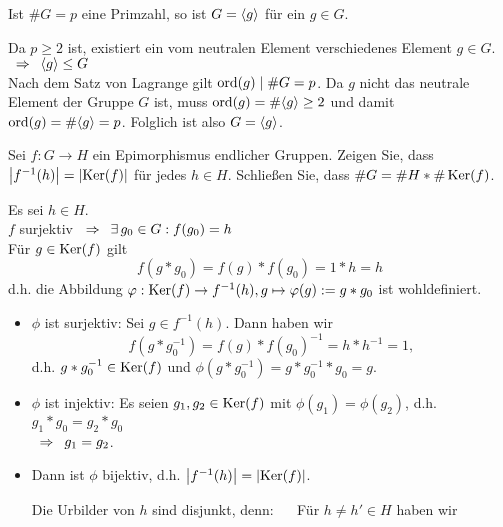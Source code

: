 \begin{exercisePage}
%
\setcounter{taskcount}{5}
%
\begin{exercise}
	Ist $\# G = p$ eine Primzahl, so ist $G = \langle g \rangle$ für ein $g \in G$.
\end{exercise}
\begin{solution}
	Da $p \geq 2$ ist, existiert ein vom neutralen Element verschiedenes Element $g \in G$. \\
	$\enskip \Rightarrow \enskip \langle g \rangle \leq G$ \\
	Nach dem Satz von Lagrange gilt $\operatorname{ord}(g) \mid \# G = p$. Da $g$ nicht das neutrale Element der Gruppe $G$ ist, muss $\operatorname{ord}(g) = \# \langle g \rangle \geq 2$  und damit $\operatorname{ord}(g) = \# \langle g \rangle = p$. Folglich ist also $G = \langle g \rangle$.
\end{solution}
%
\begin{exercise}
	Sei $f: G \to H$ ein Epimorphismus endlicher Gruppen. Zeigen Sie, dass $\left| f^{-1}(h) \right| = \left| \operatorname{Ker}(f) \right|$ für jedes $h \in H$. Schließen Sie, dass $\# G = \# H * \# \operatorname{Ker}(f)$.
\end{exercise}
\begin{solution}
	Es sei $h \in H$. \\
	$f$ surjektiv $\enskip \Rightarrow \enskip \exists \, g_0 \in G : f(g_0)=h$ \\
	Für $g \in \operatorname{Ker} (f)$ gilt 
	\begin{equation*}
		f(g*g_0) = f(g) * f(g_0) = 1 * h = h
	\end{equation*}
	d.h. die Abbildung $\varphi :  \operatorname{Ker}(f) \to f^{-1}(h), g \mapsto \varphi(g) := g * g_0$ ist wohldefiniert.
	\begin{itemize}
		\item $\phi$ ist surjektiv: Sei $g \in f^{-1}(h)$. Dann haben wir
		\begin{equation*}
			f(g*g_0^{-1}) = f(g) * f(g_0)^{-1} = h * h^{-1} = 1,
		\end{equation*}
		d.h. $g*g_0^{-1} \in \operatorname{Ker}(f)$ und $\phi(g*g_0^{-1})=g*g_0^{-1}*g_0 = g$.
		\item $\phi$ ist injektiv: Es seien $g_1,g_2 \in \operatorname{Ker}(f)$ mit $\phi(g_1) = \phi(g_2)$, d.h. $g_1 * g_0 = g_2 * g_0$ \\
		$\enskip \Rightarrow \enskip g_1 = g_2$.
		\item Dann ist $\phi$ bijektiv, d.h. $\left| f^{-1}(h) \right| = \left| \operatorname{Ker}(f) \right|$. \par \medskip
		Die Urbilder von $h$ sind disjunkt, denn: $\quad$
		Für $h \neq h' \in H$ haben wir
		\begin{align*}

\end{align*}
\end{itemize}
\end{solution}
\end{exercisePage}
